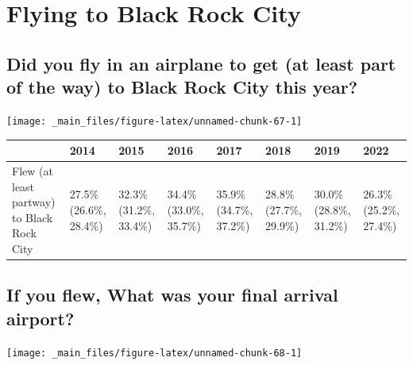 \documentclass[
]{book}
\begin{document}
\hypertarget{flying-to-black-rock-city}{%
\section{Flying to Black Rock City}\label{flying-to-black-rock-city}}

\hypertarget{did-you-fly-in-an-airplane-to-get-at-least-part-of-the-way-to-black-rock-city-this-year}{%
\subsection{Did you fly in an airplane to get (at least part of the way) to Black Rock City this year?}\label{did-you-fly-in-an-airplane-to-get-at-least-part-of-the-way-to-black-rock-city-this-year}}

\texttt{[image: \_main\_files/figure-latex/unnamed-chunk-67-1]}

\begin{table}
\centering
\begin{tabular}[t]{>{}l|>{}l|>{}l|>{}l|>{}l|>{}l|>{}l|>{}l}
\hline
  & 2014 & 2015 & 2016 & 2017 & 2018 & 2019 & 2022\\
\hline
Flew (at least partway) 
 to Black Rock City & 27.5\% (26.6\%, 28.4\%) & 32.3\% (31.2\%, 33.4\%) & 34.4\% (33.0\%, 35.7\%) & 35.9\% (34.7\%, 37.2\%) & 28.8\% (27.7\%, 29.9\%) & 30.0\% (28.8\%, 31.2\%) & 26.3\% (25.2\%, 27.4\%)\\
\hline
\end{tabular}
\end{table}

\hypertarget{if-you-flew-what-was-your-final-arrival-airport}{%
\subsection{If you flew, What was your final arrival airport?}\label{if-you-flew-what-was-your-final-arrival-airport}}

\texttt{[image: \_main\_files/figure-latex/unnamed-chunk-68-1]}
\end{document}
